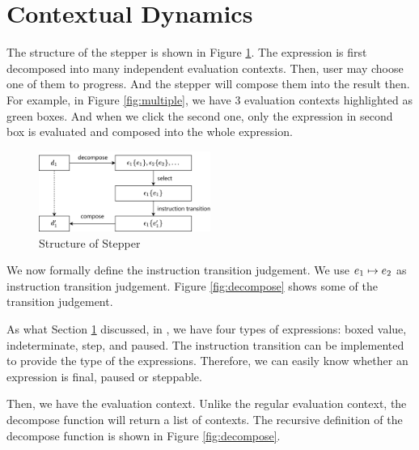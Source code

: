 \section{Contextual Dynamics}



The structure of the stepper is shown in Figure \ref{fig:structure}. The expression is first decomposed into many independent evaluation contexts. Then, user may choose one of them to progress. And the stepper will compose them into the result then. For example, in Figure \ref{fig:multiple}, we have 3 evaluation contexts highlighted as green boxes. And when we click the second one, only the expression in second box is evaluated and composed into the whole expression.

\begin{figure}[htbp]
  \centering
  \includegraphics[width=0.5\textwidth]{img/struct.png}
  \caption{Structure of Stepper}
  \label{fig:structure}
\end{figure}

We now formally define the instruction transition judgement. We use $e_1 \mapsto e_2$ as instruction transition judgement. Figure \ref{fig:decompose} shows some of the transition judgement.

As what Section \ref{} discussed, in \Hazel, we have four types of expressions: boxed value, indeterminate, step, and paused. The instruction transition can be implemented to provide the type of the expressions. Therefore, we can easily know whether an expression is final, paused or steppable.

Then, we have the evaluation context. Unlike the regular evaluation context, the decompose function will return a list of contexts. The recursive definition of the decompose function is shown in Figure \ref{fig:decompose}.

